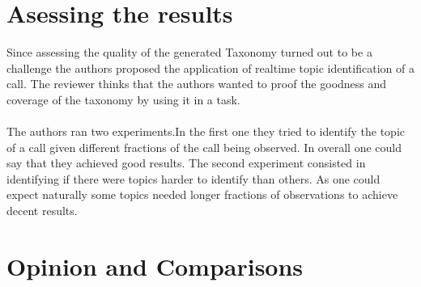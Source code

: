 \documentclass[4pt,a4paper,twocolumn]{article}
\begin{document}
\section{Asessing the results}
Since assessing the quality of the generated Taxonomy turned out to be a challenge the
authors proposed the application of realtime topic identification of a call.
The reviewer thinks that the authors wanted to proof the goodness and coverage of the 
taxonomy by using it in a task.\\
\\
The authors ran two experiments.In the first one they tried to identify the topic of a call
given different fractions of the call being observed. In overall one could say that they achieved
good results.
The second experiment consisted in identifying if there were topics harder to identify than others.
As one could expect naturally some topics needed longer fractions of observations to achieve decent results.

\section{Opinion and Comparisons}
\end{document}
